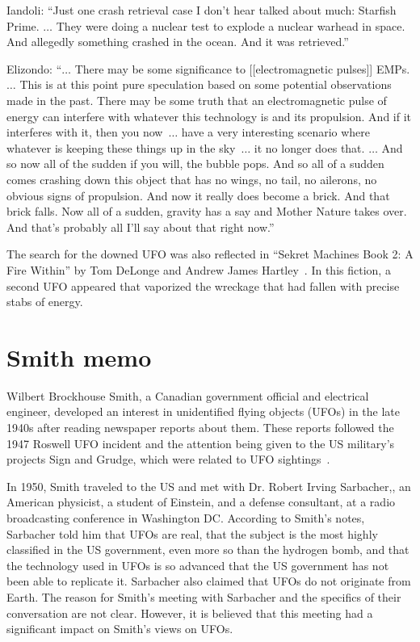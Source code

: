 \begin{svgraybox}
\noindent Iandoli: ``Just one crash retrieval case I don't hear talked about much: Starfish Prime. $\ldots $
They were doing a nuclear test to explode a nuclear warhead in space. And allegedly something
crashed in the ocean. And it was retrieved.''

\noindent Elizondo: ``$\ldots $ There may be some significance to [[electromagnetic pulses]]
EMPs. $\ldots $
This is at this point pure speculation
based on some potential observations made in the past. There may be some truth that an
electromagnetic pulse of energy can interfere with whatever this technology is and its propulsion. And
if it interferes with it, then you now~$\ldots $  have a very interesting scenario where whatever
is keeping these things up in the sky~$\ldots $  it no longer does that.
$\ldots $  And so now all of the sudden
if you will, the bubble pops. And so all of a sudden comes crashing down this object that has no wings,
no tail, no ailerons, no obvious signs of propulsion. And now it really does become a brick. And that
brick falls. Now all of a sudden, gravity has a say and Mother Nature takes over. And that's probably
all I'll say about that right now.''
\end{svgraybox}

The search for the downed UFO was also reflected in ``Sekret Machines Book 2: {A} Fire Within'' by Tom DeLonge and Andrew James Hartley~\cite{DeLongeHartley-SM2}. In this fiction, a second UFO appeared that vaporized the wreckage that had fallen with precise stabs of energy.




\section{Smith memo}
\label{2023-UFO-part-Perception-crash-retreivals-SM}



Wilbert Brockhouse Smith, a Canadian government official and electrical engineer, developed an interest in unidentified flying objects (UFOs) in the late 1940s after reading newspaper reports about them. These reports followed the 1947 Roswell UFO incident and the attention being given to the US military's projects Sign and Grudge, which were related to UFO sightings~\cite{MatthewHayes-PhD}.

In 1950, Smith traveled to the US and met with Dr. Robert Irving Sarbacher,, an American physicist, a student of Einstein, and a defense consultant, at a radio broadcasting conference in Washington DC. According to Smith's notes, Sarbacher told him that UFOs are real, that the subject is the most highly classified in the US government, even more so than the hydrogen bomb, and that the technology used in UFOs is so advanced that the US government has not been able to replicate it. Sarbacher also claimed that UFOs do not originate from Earth. The reason for Smith's meeting with Sarbacher and the specifics of their conversation are not clear. However, it is believed that this meeting had a significant impact on Smith's views on UFOs.

